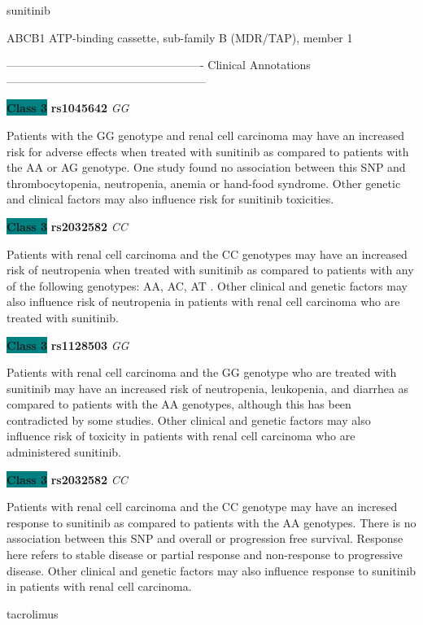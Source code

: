 \documentclass{resume} %
\begin{document}
\begin{rSection}{ sunitinib }
\begin{rSubsection}{ ABCB1 }{ ATP-binding cassette, sub-family B (MDR/TAP), member 1 }{}{}
\item[] ---------------------------------------------------- Clinical Annotations -----------------------------------------------------\newline
\item \textbf{\colorbox{teal} {Class 3}} \textbf{ rs1045642 } \textit{ GG }
\item[] Patients with the GG genotype and renal cell carcinoma may have an increased risk for adverse effects when treated with sunitinib as compared to patients with the AA or AG genotype. One study found no association between this SNP and thrombocytopenia, neutropenia, anemia or hand-food syndrome. Other genetic and clinical factors may also influence risk for sunitinib toxicities.\item \textbf{\colorbox{teal} {Class 3}} \textbf{ rs2032582 } \textit{ CC }
\item[] Patients with renal cell carcinoma and the CC genotypes may have an increased risk of neutropenia when treated with sunitinib as compared to patients with any of the following genotypes: AA, AC, AT . Other clinical and genetic factors may also influence risk of neutropenia in patients with renal cell carcinoma who are treated with sunitinib.\item \textbf{\colorbox{teal} {Class 3}} \textbf{ rs1128503 } \textit{ GG }
\item[] Patients with renal cell carcinoma and the GG genotype who are treated with sunitinib may have an increased risk of  neutropenia, leukopenia, and diarrhea as compared to patients with the AA genotypes, although this has been contradicted by some studies. Other clinical and genetic factors may also influence risk of toxicity in patients with renal cell carcinoma who are administered sunitinib.\item \textbf{\colorbox{teal} {Class 3}} \textbf{ rs2032582 } \textit{ CC }
\item[] Patients with renal cell carcinoma and the CC genotype may have an incresed response to sunitinib as compared to patients with the AA genotypes. There is no association between this SNP and overall or progression free survival.   Response here refers to stable disease or partial response and non-response to progressive disease. Other clinical and genetic factors may also influence response to sunitinib in patients with renal cell carcinoma. 
\end{rSubsection}

\end{rSection}\begin{rSection}{ tacrolimus }
\item[]


\end{rSection}
\end{document}
